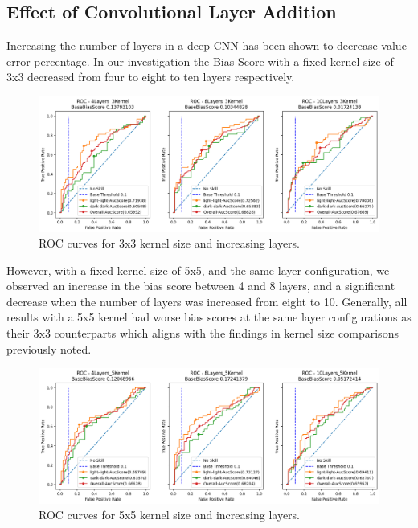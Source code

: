 \documentclass[conference]{IEEEtran}
\begin{document}
\subsection{Effect of Convolutional Layer Addition}
Increasing the number of layers in a deep CNN has been shown to decrease value error percentage\cite{simonyan2014very}. 
In our investigation the Bias Score with a fixed kernel size of 3x3 decreased from four to eight to ten layers respectively.

\begin{figure}[!t]
    \centerline{\includegraphics[width=1.05\linewidth]{latex/images/4Layers_3Kernel_8Layers_3Kernel_10Layers_3Kernel.png}}
    \caption{ROC curves for 3x3 kernel size and increasing layers.}
    \label{binarized_data}
\end{figure}

However, with a fixed kernel size of 5x5, and the same layer configuration, we observed an increase in the bias score between 4 and 8 layers, and a significant decrease when the number of layers was increased from eight to 10. Generally, all results with a 5x5 kernel had worse bias scores at the same layer configurations as their 3x3 counterparts which aligns with the findings in kernel size comparisons previously noted.

\begin{figure}[!t]
    \centerline{\includegraphics[width=1\linewidth]{latex/images/4Layers_5Kernel_8Layers_5Kernel_10Layers_5Kernel.png}}
    \caption{ROC curves for 5x5 kernel size and increasing layers.}
    \label{binarized_data}
\end{figure}
\end{document}
